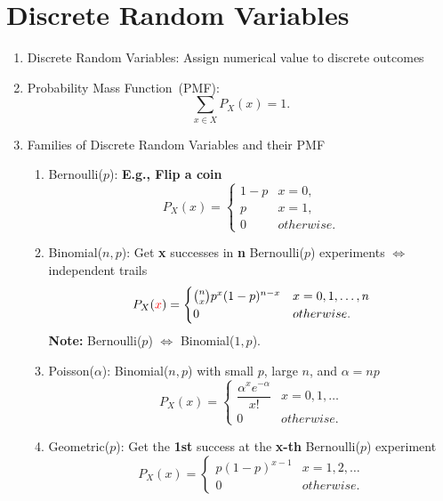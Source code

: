 \chapter{Discrete Random Variables}
\begin{enumerate}
    \item Discrete Random Variables: Assign numerical value to discrete outcomes
    \item Probability Mass Function~(PMF): \[\sum_{x\in X}P_X(x)=1.\] 
    \item Families of Discrete Random Variables and their PMF{
        \begin{enumerate}
            \item Bernoulli($p$): \textbf{E.g., Flip a coin}{
                \[ P_X(x) = 
                \begin{cases}
                    1-p & x=0, \\
                    p   & x=1, \\
                    0   & otherwise.
                \end{cases} \]
            }
            \item Binomial($n, p$): Get \textbf{x} successes in \textbf{n} Bernoulli($p$) experiments $\iff$ independent trails{
                \[P_X(\textcolor{red}{x}) = {
                    \begin{cases}
                        \binom{n}{x}p^x(1-p)^{n-x} & x=0,1,\ldots,n \\ 
                        0 & otherwise.
                    \end{cases}
                }\]
                \textbf{Note:} Bernoulli($p$) $\iff$ Binomial($1, p$). 
            }
            \item Poisson($\alpha$): Binomial($n, p$) with small $p$, large $n$, and $\alpha=np${
                \[ P_X(x) = 
                \begin{cases}
                    \dfrac{\alpha^xe^{-\alpha}}{x!}   & x=0,1,\ldots \\
                    0   & otherwise.
                \end{cases} \]
            }
            \item Geometric($p$): Get the \textbf{1st} success at the \textbf{x-th} Bernoulli($p$) experiment {
                \[ P_X(x) = 
                \begin{cases}
                    p(1-p)^{x-1} & x=1,2,\ldots \\
                    0   & otherwise.
                \end{cases} \]
}
\end{enumerate}}
\end{enumerate}
